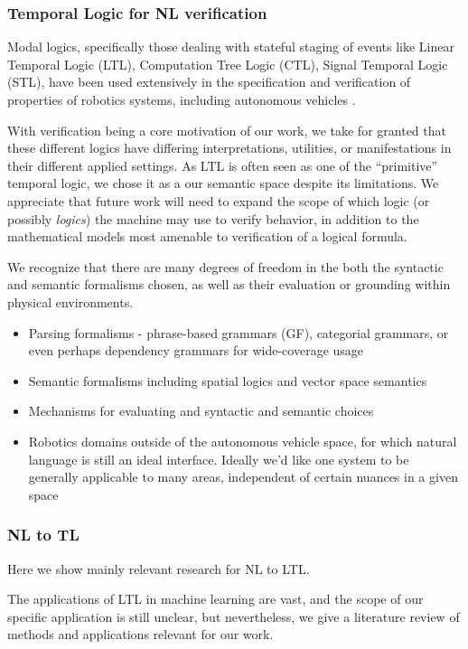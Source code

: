 \documentclass[a4paper, 11pt]{article}
\begin{document}
\subsubsection{Temporal Logic for NL verification}

Modal logics, specifically those dealing with stateful staging of events like
Linear Temporal Logic (LTL), Computation Tree Logic (CTL), Signal Temporal Logic
(STL), have been used extensively in the specification and verification of properties
of robotics systems, including autonomous vehicles \cite{}.

With verification being a core motivation of our work, we take for granted that
these different logics have differing interpretations, utilities, or
manifestations in their different applied settings. As LTL is often seen as one
of the ``primitive'' temporal logic, we chose it as a our semantic space despite
its limitations. We appreciate that future work will need to expand the scope of 
which logic (or possibly \emph{logics}) the machine may use to verify behavior,
in addition to the mathematical models most amenable to verification of a logical formula.

We recognize that there are many degrees of freedom in the both the syntactic
and semantic formalisms chosen, as well as their evaluation or grounding within
physical environments.

\begin{itemize}
\item Parsing formalisms - phrase-based grammars (GF), categorial grammars, or
  even perhaps dependency grammars for wide-coverage usage
\item Semantic formalisms including spatial logics and vector space semantics
\item Mechanisms for evaluating and syntactic and semantic choices 
\item Robotics domains outside of the autonomous vehicle space, for which
  natural language is still an ideal interface. Ideally we'd like one system to
  be generally applicable to many areas, independent of certain nuances in a
  given space
\end{itemize}

\subsubsection{NL to TL}

Here we show mainly relevant research for NL to LTL.

The applications of LTL in machine learning are vast, and the scope of our
specific application is still unclear, but nevertheless, we give a literature
review of methods and applications relevant for our work.
\end{document}
